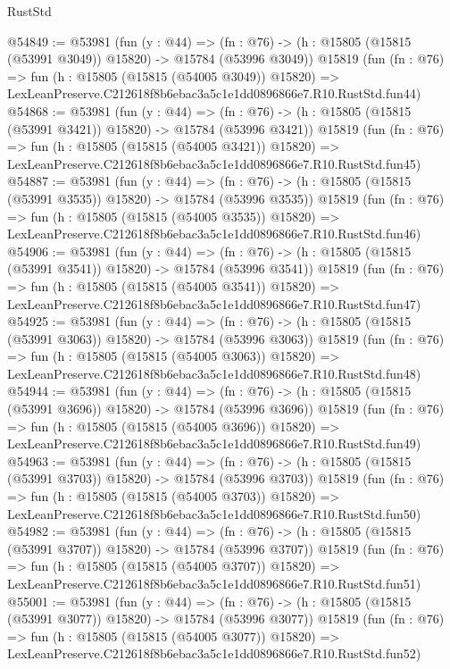 \begin{lexlean}{RustStd}
\begin{coremodule}
@54849 := @53981
    (fun (y : @44) =>
    (fn : @76) -> (h : @15805 (@15815 (@53991 @3049)) @15820) -> @15784 (@53996 @3049))
    @15819
    (fun (fn : @76) =>
    fun (h : @15805 (@15815 (@54005 @3049)) @15820) =>
    LexLeanPreserve.C212618f8b6ebac3a5c1e1dd0896866e7.R10.RustStd.fun44)
@54868 := @53981
    (fun (y : @44) =>
    (fn : @76) -> (h : @15805 (@15815 (@53991 @3421)) @15820) -> @15784 (@53996 @3421))
    @15819
    (fun (fn : @76) =>
    fun (h : @15805 (@15815 (@54005 @3421)) @15820) =>
    LexLeanPreserve.C212618f8b6ebac3a5c1e1dd0896866e7.R10.RustStd.fun45)
@54887 := @53981
    (fun (y : @44) =>
    (fn : @76) -> (h : @15805 (@15815 (@53991 @3535)) @15820) -> @15784 (@53996 @3535))
    @15819
    (fun (fn : @76) =>
    fun (h : @15805 (@15815 (@54005 @3535)) @15820) =>
    LexLeanPreserve.C212618f8b6ebac3a5c1e1dd0896866e7.R10.RustStd.fun46)
@54906 := @53981
    (fun (y : @44) =>
    (fn : @76) -> (h : @15805 (@15815 (@53991 @3541)) @15820) -> @15784 (@53996 @3541))
    @15819
    (fun (fn : @76) =>
    fun (h : @15805 (@15815 (@54005 @3541)) @15820) =>
    LexLeanPreserve.C212618f8b6ebac3a5c1e1dd0896866e7.R10.RustStd.fun47)
@54925 := @53981
    (fun (y : @44) =>
    (fn : @76) -> (h : @15805 (@15815 (@53991 @3063)) @15820) -> @15784 (@53996 @3063))
    @15819
    (fun (fn : @76) =>
    fun (h : @15805 (@15815 (@54005 @3063)) @15820) =>
    LexLeanPreserve.C212618f8b6ebac3a5c1e1dd0896866e7.R10.RustStd.fun48)
@54944 := @53981
    (fun (y : @44) =>
    (fn : @76) -> (h : @15805 (@15815 (@53991 @3696)) @15820) -> @15784 (@53996 @3696))
    @15819
    (fun (fn : @76) =>
    fun (h : @15805 (@15815 (@54005 @3696)) @15820) =>
    LexLeanPreserve.C212618f8b6ebac3a5c1e1dd0896866e7.R10.RustStd.fun49)
@54963 := @53981
    (fun (y : @44) =>
    (fn : @76) -> (h : @15805 (@15815 (@53991 @3703)) @15820) -> @15784 (@53996 @3703))
    @15819
    (fun (fn : @76) =>
    fun (h : @15805 (@15815 (@54005 @3703)) @15820) =>
    LexLeanPreserve.C212618f8b6ebac3a5c1e1dd0896866e7.R10.RustStd.fun50)
@54982 := @53981
    (fun (y : @44) =>
    (fn : @76) -> (h : @15805 (@15815 (@53991 @3707)) @15820) -> @15784 (@53996 @3707))
    @15819
    (fun (fn : @76) =>
    fun (h : @15805 (@15815 (@54005 @3707)) @15820) =>
    LexLeanPreserve.C212618f8b6ebac3a5c1e1dd0896866e7.R10.RustStd.fun51)
@55001 := @53981
    (fun (y : @44) =>
    (fn : @76) -> (h : @15805 (@15815 (@53991 @3077)) @15820) -> @15784 (@53996 @3077))
    @15819
    (fun (fn : @76) =>
    fun (h : @15805 (@15815 (@54005 @3077)) @15820) =>
    LexLeanPreserve.C212618f8b6ebac3a5c1e1dd0896866e7.R10.RustStd.fun52)

\end{coremodule}
\end{lexlean}
